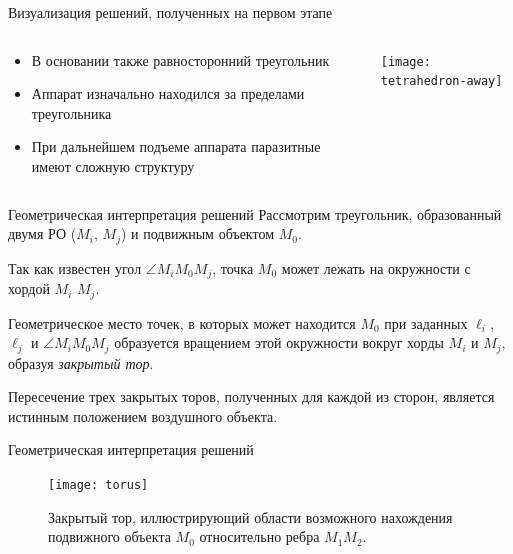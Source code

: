 \documentclass[russian,hyperref={unicode}]{beamer}
\begin{document}
  \begin{frame}{Визуализация решений, полученных на первом этапе}
    \begin{columns}[c]
      \begin{column}{.5\textwidth}
        \begin{itemize}
          \item В основании также равносторонний треугольник
          \item Аппарат изначально находился за пределами треугольника
          \item При дальнейшем подъеме аппарата паразитные имеют сложную структуру
        \end{itemize}
      \end{column}
      \begin{column}{.5\textwidth}
        \begin{center}
          \texttt{[image: tetrahedron-away]}
        \end{center}
      \end{column}
    \end{columns}
  \end{frame}

  \begin{frame}{Геометрическая интерпретация решений}
    Рассмотрим треугольник, образованный двумя РО ($M_i$, $M_j$) и подвижным объектом $M_0$.

    Так как известен угол $\angle M_i M_0 M_j$, точка $M_0$ может лежать на окружности с хордой $M_i$ $M_j$.

    Геометрическое место точек, в которых может находится $M_0$ при заданных $\ell_{i}$, $\ell_{j}$ и $\angle M_i M_0 M_j$ образуется вращением этой окружности вокруг хорды $M_i$ и $M_j$, образуя \textit{закрытый тор}.

    Пересечение трех закрытых торов, полученных для каждой из сторон, является истинным положением воздушного объекта.
  \end{frame}

  \begin{frame}{Геометрическая интерпретация решений}
    \begin{center}
      \begin{figure}
        \texttt{[image: torus]}
        \caption{Закрытый тор, иллюстрирующий области возможного нахождения подвижного объекта $M_0$ относительно ребра $M_1M_2$.}
      \end{figure}
    \end{center}
  \end{frame}
\end{document}
